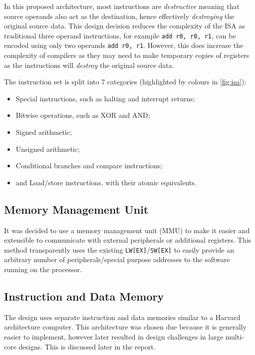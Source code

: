 In this proposed architecture, most instructions are \textit{destructive} meaning that source operands also act as the destination, hence effectively \textit{destroying} the original source data. This design decision reduces the complexity of the ISA as traditional three operand instructions, for example \verb|add r0, r0, r1|, can be encoded using only two operands \verb|add r0, r1|. However, this does increase the complexity of compilers as they may need to make temporary copies of registers as the instructions will \textit{destroy} the original source data.

The instruction set is split into 7 categories (highlighted by colours in \cref{fig:isa}):
\begin{itemize}
\item Special instructions, such as halting and interrupt returns;
\item Bitwise operations, such as XOR and AND;
\item Signed arithmetic;
\item Unsigned arithmetic;
\item Conditional branches and compare instructions;
\item and Load/store instructions, with their atomic equivalents.
\end{itemize}


\subsection{Memory Management Unit}
It was decided to use a memory management unit (MMU) to make it easier and extensible to communicate with external peripherals or additional registers. This method transparently uses the existing \verb|LW[EX]|/\verb|SW[EX]| to easily provide an arbitrary number of peripherals/special purpose addresses to the software running on the processor.

\subsection{Instruction and Data Memory}
The design uses separate instruction and data memories similar to a Harvard architecture computer. This architecture was chosen due because it is generally easier to implement, however later resulted in design challenges in large multi-core designs. This is discussed later in the report.

